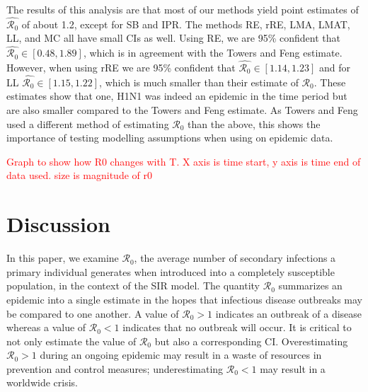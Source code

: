 \documentclass[12pt]{article}
\newcommand{\com}[1]{\textcolor{red}{ #1}}
\newcommand{\rr}{\ensuremath{\mathcal{R}_0}}
\begin{document}
The results of this analysis are that most of our methods yield point estimates of $\hat{\rr}$ of about 1.2, except for SB and IPR.  The methods RE, rRE, LMA, LMAT, LL, and MC all have small CIs as well.  Using RE, we are 95\% confident that $\hat{\rr} \in [0.48, 1.89]$, which is in agreement with the Towers and Feng estimate.  However, when using rRE we are 95\% confident that $\hat{\rr} \in [1.14, 1.23]$ and for LL $\hat{\rr} \in [1.15, 1.22]$, which is much smaller than their estimate of $\rr$.  These estimates show that one, H1N1 was indeed an epidemic in the time period but are also smaller compared to the Towers and Feng estimate.  As Towers and Feng used a different method of estimating $\rr$ than the above, this shows the importance of testing modelling assumptions when using on epidemic data.

\com{Graph to show how R0 changes with T.  X axis is time start, y axis is time end of data used.  size is magnitude of r0}

      
\section{Discussion}\label{sec:discussion}



In this paper, we examine $\rr$, the average number of secondary infections a primary individual generates when introduced into a completely susceptible population, in the context of the SIR model.  The quantity $\rr$ summarizes an epidemic into a single estimate in the hopes that infectious disease outbreaks may be compared to one another.  A value of $\rr > 1$ indicates an outbreak of a disease whereas a value of $\rr < 1$ indicates that no outbreak will occur.  It is critical to not only estimate the value of $\rr$ but also a corresponding CI.  Overestimating $\rr > 1$ during an ongoing epidemic may result in a waste of resources in prevention and control measures; underestimating $\rr < 1$ may result in a worldwide crisis.
\end{document}
